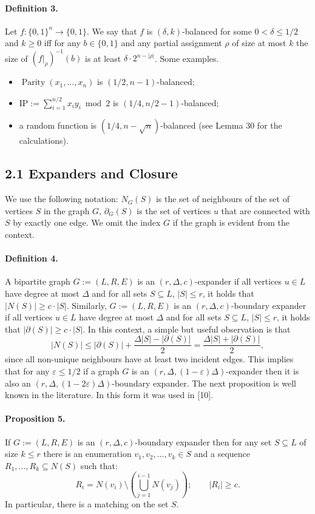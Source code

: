 \documentclass[10pt,a4paper]{article}
\begin{document}
\paragraph{Definition 3.} Let $f:\{0,1\}^n\to\{0,1\}$. We say that $f$ is $(\delta,k)$-balanced for some $0<\delta\leq1/2$ and $k\geq0$ iff for any $b\in\{0,1\}$ and any partial assignment $\rho$ of size at most $k$ the size of $(f|_\rho)^{-1}(b)$ is at least $\delta\cdot2^{n-|\rho|}$.
Some examples.
\begin{itemize}
\item $\operatorname{Parity}(x_1,\ldots,x_n)$ is $(1/2,n-1)$-balanced;
\item $\mathrm{IP}:=\sum_{i=1}^{n/2}x_iy_i\bmod2$ is $(1/4,n/2-1)$-balanced;
\item a random function is $(1/4,n-\sqrt n)$-balanced (see Lemma 30 for the calculations).
\end{itemize}
\subsection*{2.1 Expanders and Closure}
We use the following notation: $N_G(S)$ is the set of neighbours of the set of vertices $S$ in the graph $G$, $\partial_G(S)$ is the set of vertices $u$ that are connected with $S$ by exactly one edge. We omit the index $G$ if the graph is evident from the context.
\paragraph{Definition 4.} A bipartite graph $G:=(L,R,E)$ is an $(r,\Delta,c)$-expander if all vertices $u\in L$ have degree at most $\Delta$ and for all sets $S\subseteq L$, $|S|\leq r$, it holds that $|N(S)|\geq c\cdot|S|$. Similarly, $G:=(L,R,E)$ is an $(r,\Delta,c)$-boundary expander if all vertices $u\in L$ have degree at most $\Delta$ and for all sets $S\subseteq L$, $|S|\leq r$, it holds that $|\partial(S)|\geq c\cdot|S|$.
In this context, a simple but useful observation is that
\[|N(S)|\leq|\partial(S)|+\frac{\Delta|S|-|\partial(S)|}2=\frac{\Delta|S|+|\partial(S)|}2,\]
since all non-unique neighbours have at least two incident edges. This implies that for any $\varepsilon\leq1/2$ if a graph $G$ is an $(r,\Delta,(1-\varepsilon)\Delta)$-expander then it is also an $(r,\Delta,(1-2\varepsilon)\Delta)$-boundary expander.
The next proposition is well known in the literature. In this form it was used in [10].
\paragraph{Proposition 5.} If $G:=(L,R,E)$ is an $(r,\Delta,c)$-boundary expander then for any set $S\subseteq L$ of size $k\leq r$ there is an enumeration $v_1,v_2,\ldots,v_k\in S$ and a sequence $R_1,\ldots,R_k\subseteq N(S)$ such that:
\[R_i=N(v_i)\setminus\left(\bigcup_{j=1}^{i-1}N(v_j)\right);\qquad|R_i|\geq c.\]
In particular, there is a matching on the set $S$.
\end{document}
